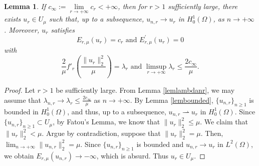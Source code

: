 \documentclass[11pt]{amsart}
\newtheorem{lemma}[theorem]{Lemma}
\newcommand{\norm}[1]{\lVert#1\rVert}
\numberwithin{equation}{section}
\begin{document}
\begin{lemma}\label{lemunr}
    If $c_\infty:=\lim\limits_{r\to+\infty} c_r < + \infty$, then for $r>1$ sufficiently large, there exists $u_r \in U_\mu$ such that, up to a subsequence, $u_{n,r} \to u_r$ in $H^1_0(\Omega)$, as $n \to +\infty$. Moreover, $u_r$ satisfies $$
E_{r, \mu}(u_{r})=c_{r} \text{ and } E_{r, \mu}^{\prime}(u_{r})=0
$$
with
$$
 \frac{2}{\mu}f'_r\left(\frac{\norm{u_r}_2^2}{\mu}\right) = \lambda_{r}  \text{ and } \limsup_{r \to +\infty}\lambda_{r} \leq \frac{2c_\infty}{\mu}.
$$
\end{lemma}
\begin{proof}
    Let $r>1$ be sufficiently large. From Lemma \ref{lemlambdanr}, we may assume that $\lambda_{n,r} \to \lambda_{r}\leq \frac{2{c_\infty}}{\mu}$ as $n \to +\infty$. By Lemma \ref{lembounded}, $\{u_{n,r}\}_{n\geq 1}$ is bounded in $H^1_0(\Omega)$, and thus, up to a subsequence, $u_{n,r} \rightharpoonup u_{r}$ in $H^1_0(\Omega)$. Since $\{u_{n,r}\}_{n \geq 1} \subset U_\mu$, by Fatou's Lemma, we know that $\norm{u_{r}}_2^2\leq \mu$. We claim that $\norm{u_{r}}^2_2<\mu$. Argue by contradiction, suppose that $\norm{u_{r}}_2^2= \mu$. Then, $\displaystyle\lim_{n \to +\infty}\norm{u_{n,r}}_2^2= \mu$. Since $\{u_{n,r}\}_{n \geq 1}$ is bounded and $u_{n,r} \to u_r$ in $L^{2}(\Omega)$,  we obtain $E_{r,\mu}(u_{n,r}) \rightarrow -\infty$, which is absurd. Thus $u_r \in U_\mu$.


\end{proof}
\end{document}
